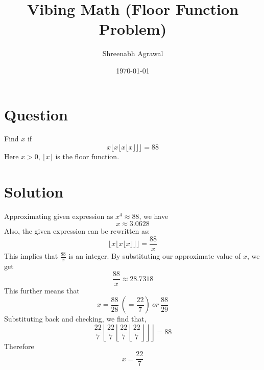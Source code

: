 \documentclass{article}
\title{Vibing Math (Floor Function Problem)}
\author{Shreenabh Agrawal}
\date{\today}
\begin{document}
\maketitle

\section{Question}

    Find $x$ if
$$x{\lfloor x {\lfloor x {\lfloor x \rfloor}\rfloor}\rfloor}=88$$
Here $x>0$, $\lfloor x \rfloor$ is the floor function.

\section{Solution}
Approximating given expression as $x^4\approx88$, we have $$x\approx3.0628$$Also, the given expression can be rewritten as: $${\lfloor x {\lfloor x {\lfloor x \rfloor}\rfloor}\rfloor}=\frac{88}{x}$$
This implies that $\frac{88}{x}$ is an integer. By substituting our approximate value of $x$, we get $$\frac{88}{x} \approx 28.7318$$
This further means that $$x = \frac{88}{28} \: \left(=\frac{22}{7}\right) \:or\: \frac{88}{29}$$
Substituting back and checking, we find that, 
$$\frac{22}{7} {\left\lfloor \frac{22}{7} {\left\lfloor \frac{22}{7} {\left\lfloor \frac{22}{7} \right\rfloor}\right\rfloor}\right\rfloor} = 88$$
Therefore
$$\boxed{x = \frac{22}{7}}$$
\end{document}
